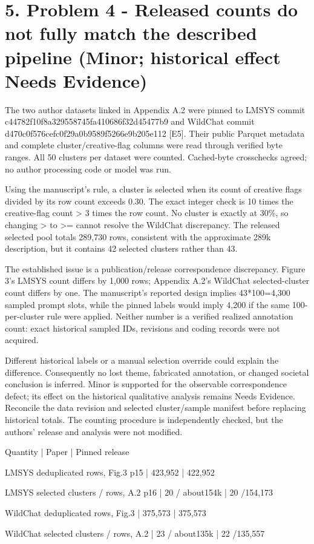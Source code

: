 \documentclass[10pt]{article}
\begin{document}
\section*{5. Problem 4 - Released counts do not fully match the described pipeline (Minor; historical effect Needs Evidence)}
The two author datasets linked in Appendix A.2 were pinned to LMSYS commit c44782f10f8a329558745fa410686f32d45477b9 and WildChat commit d470c0f576cefc0f29a0b9589f5266e9b205e112 [E5]. Their public Parquet metadata and complete cluster/creative-flag columns were read through verified byte ranges. All 50 clusters per dataset were counted. Cached-byte crosschecks agreed; no author processing code or model was run.\par
Using the manuscript’s rule, a cluster is selected when its count of creative flags divided by its row count exceeds 0.30. The exact integer check is 10 times the creative-flag count > 3 times the row count. No cluster is exactly at 30\%, so changing > to >= cannot resolve the WildChat discrepancy. The released selected pool totals 289,730 rows, consistent with the approximate 289k description, but it contains 42 selected clusters rather than 43.\par
The established issue is a publication/release correspondence discrepancy. Figure 3’s LMSYS count differs by 1,000 rows; Appendix A.2’s WildChat selected-cluster count differs by one. The manuscript’s reported design implies 43*100=4,300 sampled prompt slots, while the pinned labels would imply 4,200 if the same 100-per-cluster rule were applied. Neither number is a verified realized annotation count: exact historical sampled IDs, revisions and coding records were not acquired.\par
Different historical labels or a manual selection override could explain the difference. Consequently no lost theme, fabricated annotation, or changed societal conclusion is inferred. Minor is supported for the observable correspondence defect; its effect on the historical qualitative analysis remains Needs Evidence. Reconcile the data revision and selected cluster/sample manifest before replacing historical totals. The counting procedure is independently checked, but the authors’ release and analysis were not modified.\par
Quantity | Paper | Pinned release\par
LMSYS deduplicated rows, Fig.3 p15 | 423,952 | 422,952\par
LMSYS selected clusters / rows, A.2 p16 | 20 / about154k | 20 /154,173\par
WildChat deduplicated rows, Fig.3 | 375,573 | 375,573\par
WildChat selected clusters / rows, A.2 | 23 / about135k | 22 /135,557\par
\end{document}
